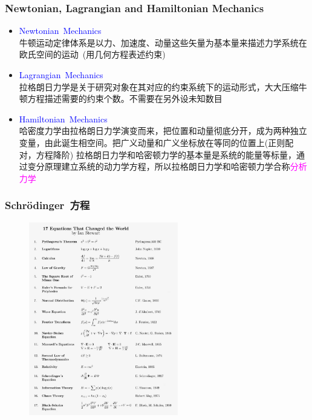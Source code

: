 \frame
{
	\frametitle{\textrm{\small Newtonian, Lagrangian and Hamiltonian Mechanics}}
	\begin{itemize}
   		\setlength{\itemsep}{10pt}
		\item \textrm{\textcolor{blue}{Newtonian~Mechanics}}\\
		牛顿运动定律体系是以力、加速度、动量这些矢量为基本量来描述力学系统在欧氏空间的运动~(用几何方程表述约束)
	\item \textrm{\textcolor{blue}{Lagrangian~Mechanics}}\\
		拉格朗日力学是关于研究对象在其对应的约束系统下的运动形式，大大压缩牛顿方程描述需要的约束个数。不需要在另外设未知数目
	\item \textrm{\textcolor{blue}{Hamiltonian~Mechanics}}\\
		哈密度力学由拉格朗日力学演变而来，把位置和动量彻底分开，成为两种独立变量，由此诞生相空间。把广义动量和广义坐标放在等同的位置上(正则配对，方程降阶)
		\vskip 6pt
		拉格朗日力学和哈密顿力学的基本量是系统的能量等标量，通过变分原理建立系统的动力学方程，所以拉格朗日力学和哈密顿力学合称\textcolor{magenta}{分析力学}
	\end{itemize}
}

\frame
{
	\frametitle{\textrm{Schr\"odinger}~方程}
\begin{figure}[h!]
\centering
%
\vspace{-10.5pt}
\includegraphics[height=0.72\textwidth,width=0.58\textwidth,viewport=0 0 1050 1400,clip]{Figures/Great_Equation.jpg}
\label{Great_Equation}
\end{figure}
}

